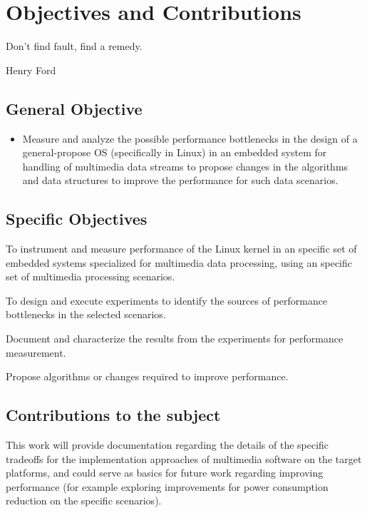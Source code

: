 \chapter{Objectives and Contributions}
\epigraph{Don't find fault, find a remedy.}{Henry Ford}

\section{General Objective}

\begin{itemize}
\item Measure and analyze the possible performance bottlenecks in the design of a general-propose \acl{OS} (specifically in Linux) in an embedded system for handling of multimedia data streams to propose changes in the algorithms and data structures to improve the performance for such data scenarios.
\end{itemize}

\section{Specific Objectives}
\begin{itemize*}
\item To instrument and measure performance of the Linux kernel in an specific set of embedded systems specialized for multimedia data processing, using an specific set of multimedia processing scenarios.
\item To design and execute experiments to identify the sources of performance bottlenecks in the selected scenarios.
\item Document and characterize the results from the experiments for performance measurement.
\item Propose algorithms or changes required to improve performance.
\end{itemize*}

\section{Contributions to the subject}
This work will provide documentation regarding the details of the specific tradeoffs for the implementation approaches of multimedia software on the target platforms, and could serve as basics for future work regarding improving performance (for example exploring improvements for power consumption reduction on the specific scenarios).

